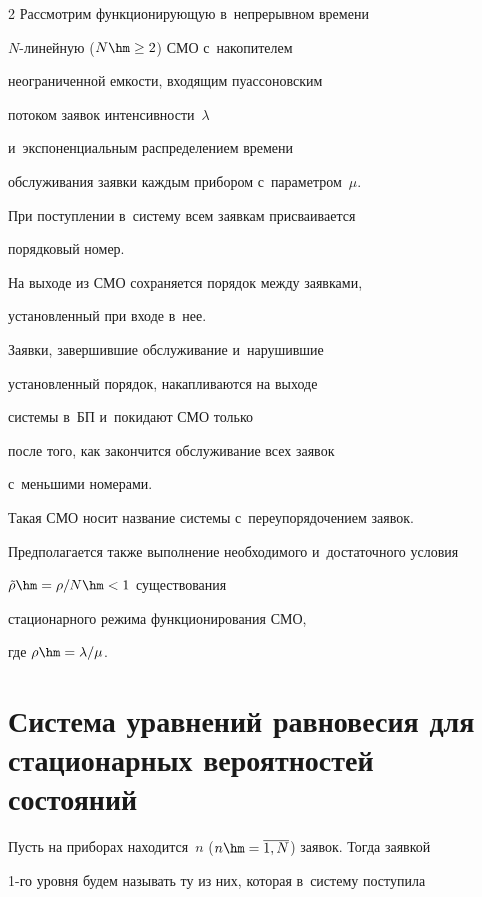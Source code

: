 \begin{multicols}{2}
Рассмотрим функционирующую в~непрерывном времени


$N$-ли\-ней\-ную ($N\hm\ge 2$) СМО с~на\-ко\-пителем


неограниченной емкости, входящим пу\-ассоновским


потоком заявок интенсивности~$\lambda$\linebreak


 и~экспоненциальным распределением времени


обслуживания заявки каждым прибором с~пара\-мет\-ром~$\mu$.








При поступлении в~систему всем заявкам  присваивается


порядковый номер.


На выходе из СМО сохраняется порядок между заявками,


установленный при входе в~нее.


Заявки, завершившие обслуживание и~нарушившие


установленный порядок, накапливаются на выходе


сис\-те\-мы в~БП и~покидают СМО только


после того, как закончится обслуживание всех заявок 


с~меньшими номерами.


Такая СМО носит название системы с~переупорядочением заявок.





Предполагается также выполнение необходимого и~достаточного условия 


${\tilde{\rho}\hm=\rho/N\hm<1}$ существования


стационарного режима функционирования СМО,


где ${\rho\hm=\lambda/\mu}$.





\section{Система уравнений равновесия для стационарных вероятностей состояний}





Пусть на приборах находится~$n$ ($n\hm=\overline{1,N}$) заявок. Тогда заявкой


1-го уровня будем называть ту из них, которая в~систему поступила



\end{multicols}

